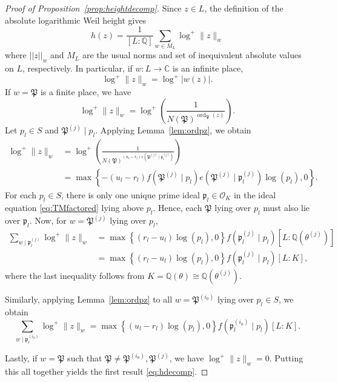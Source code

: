 \documentclass[11pt]{report}
\theoremstyle{definition}
\DeclareMathOperator{\ord}{ord}
\begin{document}
\begin{proof}[Proof of Proposition~\ref{prop:heightdecomp}]Since $z \in L$, the definition of the absolute logarithmic Weil height gives
\[h(z) = \frac{1}{[L:\mathbb{Q}]}\sum_{w \in M_L} \log^+ \|z\|_w\]
where $||z||_w$ and $M_L$ are the usual norms and set of inequivalent absolute values on $L$, respectively. In particular, if $w: L \to \mathbb{C}$ is an infinite place,
\[ \log^+ \|z\|_{w} = \log^+|w(z)|.\]
If $w = \mathfrak{P}$ is a finite place, we have
\[ \log^+ \|z\|_{w} = \log^+ \left(\frac{1}{N(\mathfrak{P})^{\ord_{\mathfrak{P}}(z)}} \right). \]
Let $p_l \in S$ and $\mathfrak{P}^{(j)}\mid p_l$. Applying Lemma~\ref{lem:ordpz}, we obtain
\begin{align*}
\log^+ \|z\|_{w}
 	& = \log^+ \left(\frac{1}{N(\mathfrak{P})^{(u_l - r_l)e(\mathfrak{P}^{(j)}\mid\mathfrak{p}_l^{(j)})}} \right)\\
	& = \max \left\{ -(u_l - r_l)f(\mathfrak{P}^{(j)}\mid p_l)e(\mathfrak{P}^{(j)}\mid\mathfrak{p}_l^{(j)})\log(p_l), 0\right\}.
\end{align*}
For each $p_l \in S$, there is only one unique prime ideal $\mathfrak{p}_l \in \mathcal{O}_K$ in the ideal equation \eqref{eq:TMfactored} lying above $p_l$. Hence, each $\mathfrak{P}$ lying over $p_l$ must also lie over $\mathfrak{p}_l$. Now, for $w = \mathfrak{P}^{(j)}$ lying over $p_l$,
\begin{align*}
\sum_{w \mid \mathfrak{p}_l^{(j)}} \log^+ \|z\|_{w}
	& = \max \left\{ (r_l - u_l)\log(p_l), 0\right\}f(\mathfrak{p}_l^{(j)}\mid p_l)[L:\mathbb{Q}(\theta^{(j)})]\\
	& = \max \left\{ (r_l - u_l)\log(p_l), 0\right\}f(\mathfrak{p}_l^{(j)}\mid p_l)[L:K],
\end{align*}
where the last inequality follows from $K = \mathbb{Q}(\theta) \cong \mathbb{Q}(\theta^{(j)})$.

Similarly, applying Lemma~\ref{lem:ordpz} to all $w = \mathfrak{P}^{(i_0)}$ lying over $p_l \in S$, we obtain
\[\sum_{w \mid \mathfrak{p}_l^{(i_0)}} \log^+\|z\|_w = \max \left\{ (u_l - r_l)\log(p_l), 0\right\}f(\mathfrak{p}_l^{(i_0)}\mid p_l)[L:K].\]

Lastly, if $w = \mathfrak{P}$ such that $\mathfrak{P} \neq \mathfrak{P}^{(i_0)},  \mathfrak{P}^{(j)}$, we have $\log^+\|z\|_w = 0$. Putting this all together yields the first result \eqref{eq:hdecomp}.


\end{proof}
\end{document}
